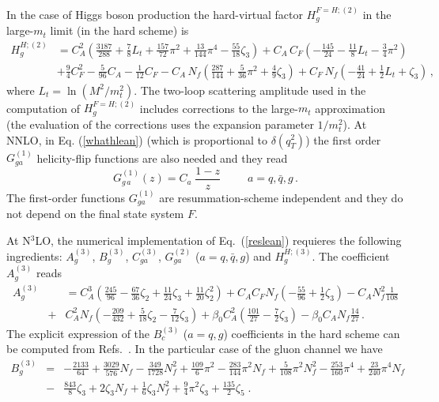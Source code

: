 \documentclass[12pt]{article}
\def\beeq{\begin{eqnarray}}
\def\eeeq{\end{eqnarray}}
\def\nn{\nonumber}
\newcommand\f[2]{\frac{#1}{#2}}
\def\qt{q_T}
\begin{document}
In the case of Higgs boson production the hard-virtual factor $H^{F=H;(2)}_{g}$ in the large-$m_t$ limit (in the hard scheme) is \cite{Catani:2011kr}
\begin{align}
\label{H2g}
H_g^{H;(2)}&=C_A^2\left(
\f{3187}{288}+\f{7}{8}L_t+\f{157}{72}\pi^2+\f{13}{144}\pi^4-\f{55}{18}\zeta_3\right)+C_A\, C_F\left(-\f{145}{24}-\f{11}{8}L_t-\f{3}{4}\pi^2\right)\nn\\
&+\f{9}{4}C_F^2
-\f{5}{96}C_A-\f{1}{12}C_F-C_A\, N_f\left(\f{287}{144}+\f{5}{36}\pi^2+\f{4}{9}\zeta_3\right)
+C_F\, N_f\left(-\f{41}{24}+\f{1}{2}L_t+\zeta_3\right)\, ,
\end{align}
where $L_t=\ln (M^2/m_t^2)$. The two-loop scattering amplitude \cite{Harlander:2009bw}  used in the computation of  $H^{F=H;(2)}_{g}$ includes corrections to the large-$m_t$ approximation (the evaluation of the corrections uses the expansion parameter $1/m_t^2$).
At NNLO, in Eq. (\ref{whathlean}) (which is proportional to $\delta(\qt^{2})$) the first order $G_{ga}^{(1)}$ helicity-flip functions are also needed and they read \cite{Catani:2010pd}
\begin{equation}
G_{g \,a}^{(1)}(z) = C_a \;\f{1-z}{z}~~~~~~~~~~~a=q,\bar{q},g\, .
\end{equation}
The first-order functions $G_{ga}^{(1)}$ are resummation-scheme independent and they do not depend on the final state system $F$.

At N$^{3}$LO, the numerical implementation of Eq.~(\ref{reslean}) requieres the following ingredients: $A^{(3)}_{g}$, $B^{(3)}_{g}$, $C^{(3)}_{ga}$, $G^{(2)}_{ga}$ ($a=q,{\bar q},g$) and $H^{H;(3)}_{g}$. The coefficient $A_g^{(3)}$ \cite{Becher:2010tm} reads
\beeq
\label{acoeff}
A_g^{(3)}\!\!\!&&\!\!\!\!\!\!\!\!  =  C_A^3 \left( \frac{245}{96} - \frac{67}{36}\zeta_2
 + \frac{11}{24}\zeta_3 + \frac{11}{20}\zeta_2^2\right) 
 + C_A C_F N_f \left(-\frac{55}{96} + \frac{1}{2}\zeta_3\right)
 - C_A N_f^2 \frac{1}{108} \nn\\
 &+& \!\!C_A^2 N_f \left(-\frac{209}{432} + \frac{5}{18}\zeta_2 - \frac{7}{12} \zeta_3\right)  
 + \beta_{0} C_A^2\left(\frac{101}{27}-\frac{7}{2}\zeta_{3}\right)- \beta_{0} C_A N_f \frac{14}{27}\,.
\eeeq
The explicit expression of the $B_c^{(3)}$ ($a=q,g$) coefficients in the hard scheme can be computed from Refs.~\cite{Li:2016ctv,Vladimirov:2016dll}. In the particular case of the gluon channel we have
\beeq
B_g^{(3)}&=& - \f{2133}{64} +  \f{3029}{576} N_{f} - \f{349}{1728} N_{f}^{2}  + \f{109}{6} \pi^{2} - \f{283}{144} \pi^{2}  N_{f} + \f{5}{108} \pi^{2}  N_{f}^{2}-\f{253}{160} \pi^{4}+\f{23}{240} \pi^{4} N_{f}\nn\\
&-& \f{843}{8} \zeta_{3} + 2 \zeta_{3} N_{f} + \f{1}{6} \zeta_{3} N_{f}^{2} + \f{9}{4} \pi^{2}  \zeta_{3} + \f{135}{2}  \zeta_{5}\;.
\eeeq
\end{document}
